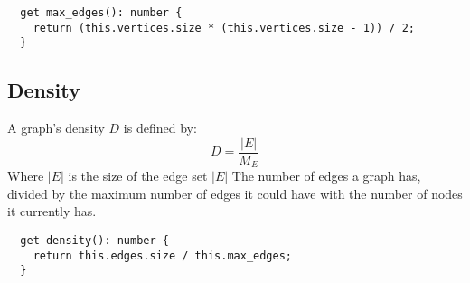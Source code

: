 \begin{verbatim}
  get max_edges(): number {
    return (this.vertices.size * (this.vertices.size - 1)) / 2;
  }
\end{verbatim}

\subsection{Density}

A graph's density $D$ is defined by:
$$D=\frac{|E|}{M_E}$$
Where $|E|$ is the size of the edge set $|E|$
The number of edges a graph has,
divided by the maximum number of edges it could have with the number of nodes it currently has.

\begin{verbatim}
  get density(): number {
    return this.edges.size / this.max_edges;
  }
\end{verbatim}
